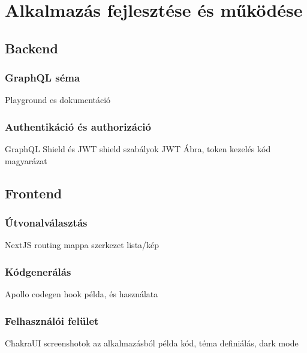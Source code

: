 
\chapter{Alkalmazás fejlesztése és működése}

\section{Backend}


\subsection{GraphQL séma}
Playground es dokumentáció

\subsection{Authentikáció és authorizáció}
GraphQL Shield és JWT
shield szabályok
JWT Ábra, token kezelés kód magyarázat

\section{Frontend}


\subsection{Útvonalválasztás}
NextJS routing mappa szerkezet lista/kép

\subsection{Kódgenerálás}
Apollo codegen
hook példa, és használata


\subsection{Felhasználói felület}
ChakraUI
screenshotok az alkalmazásból példa kód, téma definiálás, dark mode
